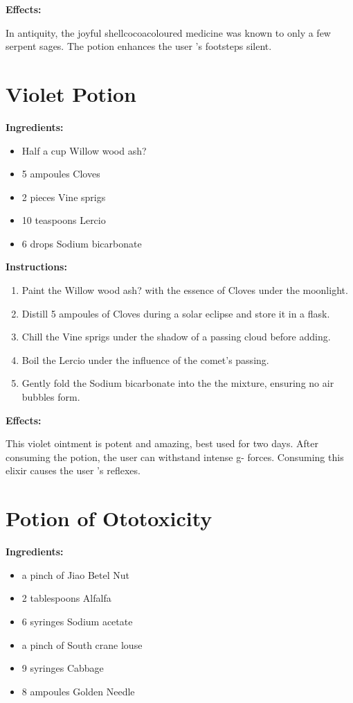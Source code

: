 \documentclass{article}
\begin{document}
\textbf{Effects:}

In antiquity, the joyful shellcocoacoloured medicine was known to only a few serpent sages. The potion enhances the user 's footsteps silent.

\newpage
\section*{Violet Potion}

\textbf{Ingredients:}

\begin{itemize}
  \item Half a cup Willow wood ash?
  \item 5 ampoules Cloves
  \item 2 pieces Vine sprigs
  \item 10 teaspoons Lercio
  \item 6 drops Sodium bicarbonate
\end{itemize}

\textbf{Instructions:}

\begin{enumerate}
  \item Paint the Willow wood ash? with the essence of Cloves under the moonlight.
  \item Distill 5 ampoules of Cloves during a solar eclipse and store it in a flask.
  \item Chill the Vine sprigs under the shadow of a passing cloud before adding.
  \item Boil the Lercio under the influence of the comet’s passing.
  \item Gently fold the Sodium bicarbonate into the the mixture, ensuring no air bubbles form.
\end{enumerate}

\textbf{Effects:}

This violet ointment is potent and amazing, best used for two days. After consuming the potion, the user can withstand intense g- forces. Consuming this elixir causes the user 's reflexes.

\newpage
\section*{Potion of Ototoxicity}

\textbf{Ingredients:}

\begin{itemize}
  \item a pinch of Jiao Betel Nut
  \item 2 tablespoons Alfalfa
  \item 6 syringes Sodium acetate
  \item a pinch of South crane louse
  \item 9 syringes Cabbage
  \item 8 ampoules Golden Needle
\end{itemize}
\end{document}
